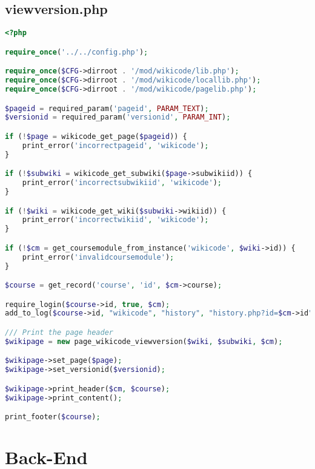 \subsection{viewversion.php}
\begin{lstlisting}[language=PHP]
<?php

require_once('../../config.php');

require_once($CFG->dirroot . '/mod/wikicode/lib.php');
require_once($CFG->dirroot . '/mod/wikicode/locallib.php');
require_once($CFG->dirroot . '/mod/wikicode/pagelib.php');

$pageid = required_param('pageid', PARAM_TEXT);
$versionid = required_param('versionid', PARAM_INT);

if (!$page = wikicode_get_page($pageid)) {
    print_error('incorrectpageid', 'wikicode');
}

if (!$subwiki = wikicode_get_subwiki($page->subwikiid)) {
    print_error('incorrectsubwikiid', 'wikicode');
}

if (!$wiki = wikicode_get_wiki($subwiki->wikiid)) {
    print_error('incorrectwikiid', 'wikicode');
}

if (!$cm = get_coursemodule_from_instance('wikicode', $wiki->id)) {
    print_error('invalidcoursemodule');
}

$course = get_record('course', 'id', $cm->course);

require_login($course->id, true, $cm);
add_to_log($course->id, "wikicode", "history", "history.php?id=$cm->id", "$wiki->id");

/// Print the page header
$wikipage = new page_wikicode_viewversion($wiki, $subwiki, $cm);

$wikipage->set_page($page);
$wikipage->set_versionid($versionid);

$wikipage->print_header($cm, $course);
$wikipage->print_content();

print_footer($course);

\end{lstlisting}

\section{Back-End}

